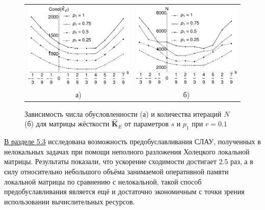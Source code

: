 \begin{figure}[ht] \centering
	\begin{tabular}{cc}
		\includegraphics[width=0.4\linewidth]{pics/MechanicalCond.pdf} &
		\includegraphics[width=0.4\linewidth]{pics/MechanicalIter.pdf} \\
		а) & б)
	\end{tabular}
    \caption{Зависимость числа обусловленности (а) и количества итераций $N$ (б) для матрицы жёсткости $\widehat{\textbf{K}}_E$ от параметров $s$ и $p_1$ при $r = 0.1$}
    \label{fig:MechanicalCondAndIter}
\end{figure}


\underline{В разделе 5.3} исследована возможность предобуславливания СЛАУ, полученных в нелокальных задачах при помощи неполного разложения Холецкого локальной матрицы. Результаты показали, что ускорение сходимости достигает 2.5 раз, а в силу относительно небольшого объёма занимаемой оперативной памяти локальной матрицы по сравнению с нелокальной, такой способ предобуславливания является ещё и достаточно экономичным с точки зрения использовании вычислительных ресурсов.

